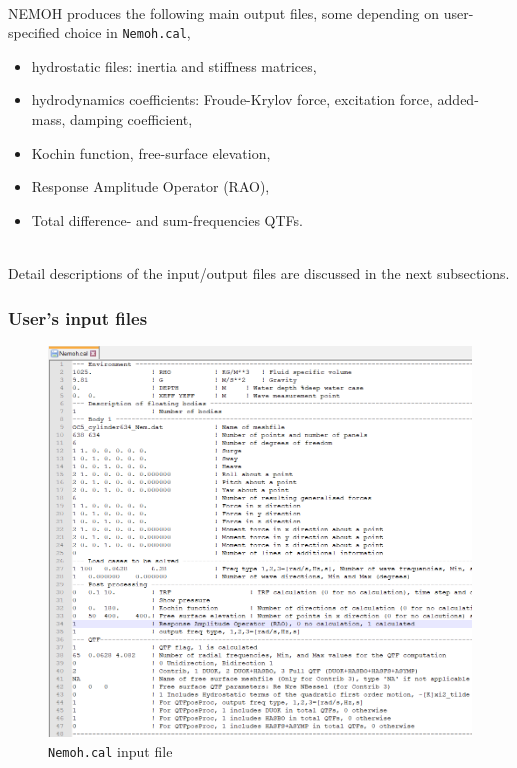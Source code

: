 \documentclass[12pt,a4paper,titlepage]{article}
\begin{document}
\ \\
NEMOH produces the following main output files, some depending on user-specified choice in \texttt{Nemoh.cal}, 
\begin{itemize}
\item hydrostatic files: inertia and stiffness matrices, 
\item hydrodynamics coefficients: Froude-Krylov force, excitation force, added-mass, damping coefficient,
\item Kochin function, free-surface elevation,
\item Response Amplitude Operator (RAO),
\item Total difference- and sum-frequencies QTFs.
\end{itemize}
\ \\
Detail descriptions of the input/output files are discussed in the next subsections.

\subsubsection{User's input files}

\begin{figure}[ht]
\centering
\includegraphics[scale=0.8,trim = 0mm 0mm 12mm 0mm, clip]{figures/NemohCal.png}	
\caption{\texttt{Nemoh.cal} input file}\label{fig:NemohCal}
\end{figure}
\end{document}
